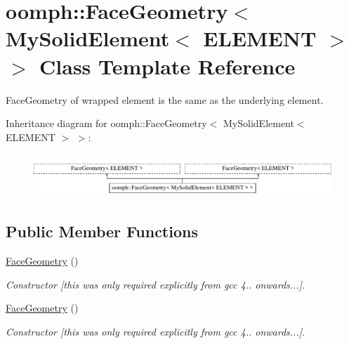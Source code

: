 \hypertarget{classoomph_1_1FaceGeometry_3_01MySolidElement_3_01ELEMENT_01_4_01_4}{}\section{oomph\+:\+:Face\+Geometry$<$ My\+Solid\+Element$<$ E\+L\+E\+M\+E\+NT $>$ $>$ Class Template Reference}
\label{classoomph_1_1FaceGeometry_3_01MySolidElement_3_01ELEMENT_01_4_01_4}


Face\+Geometry of wrapped element is the same as the underlying element.  


Inheritance diagram for oomph\+:\+:Face\+Geometry$<$ My\+Solid\+Element$<$ E\+L\+E\+M\+E\+NT $>$ $>$\+:\begin{figure}[H]
\begin{center}
\leavevmode
\includegraphics[height=1.637427cm]{classoomph_1_1FaceGeometry_3_01MySolidElement_3_01ELEMENT_01_4_01_4}
\end{center}
\end{figure}
\subsection*{Public Member Functions}
\begin{DoxyCompactItemize}
\item 
\hyperlink{classoomph_1_1FaceGeometry_3_01MySolidElement_3_01ELEMENT_01_4_01_4_a4b9e14efef623686f22fb2d3747e16c3}{Face\+Geometry} ()
\begin{DoxyCompactList}\small\item\em Constructor \mbox{[}this was only required explicitly from gcc 4.. onwards...\mbox{]}. \end{DoxyCompactList}\item 
\hyperlink{classoomph_1_1FaceGeometry_3_01MySolidElement_3_01ELEMENT_01_4_01_4_a4b9e14efef623686f22fb2d3747e16c3}{Face\+Geometry} ()
\begin{DoxyCompactList}\small\item\em Constructor \mbox{[}this was only required explicitly from gcc 4.. onwards...\mbox{]}. \end{DoxyCompactList}\end{DoxyCompactItemize}



